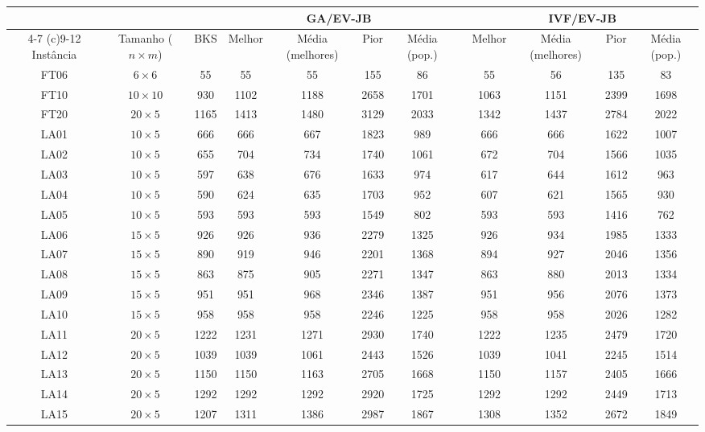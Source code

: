\begin{sidewaystable}
\caption{Resultados do caso de experimento 9}
\centering
\label{experimento9}
\begin{tabular}{cccccccccccc}
\toprule
& & & \multicolumn{4}{c}{GA/EV-JB} & & \multicolumn{4}{c}{IVF/EV-JB} \\
\cmidrule(c){4-7}
\cmidrule(c){9-12}
Inst\^{a}ncia & Tamanho ($n \times m$) & BKS & Melhor & M\'{e}dia (melhores) & Pior & M\'{e}dia (pop.) & & Melhor & M\'{e}dia (melhores) & Pior & M\'{e}dia (pop.) \\
\midrule
FT06 & $6 \times 6$ & 55 & 55 & 55 & 155 & 86 & & 55 & 56 & 135 & 83 \\
FT10 & $10 \times 10$ & 930 & 1102 & 1188 & 2658 & 1701 & & 1063 & 1151 & 2399 & 1698 \\
FT20 & $20 \times 5$ & 1165 & 1413 & 1480 & 3129 & 2033 & & 1342 & 1437 & 2784 & 2022 \\
LA01 & $10 \times 5$ & 666 & 666 & 667 & 1823 & 989 & & 666 & 666 & 1622 & 1007 \\
LA02 & $10 \times 5$ & 655 & 704 & 734 & 1740 & 1061 & & 672 & 704 & 1566 & 1035 \\
LA03 & $10 \times 5$ & 597 & 638 & 676 & 1633 & 974 & & 617 & 644 & 1612 & 963 \\
LA04 & $10 \times 5$ & 590 & 624 & 635 & 1703 & 952 & & 607 & 621 & 1565 & 930 \\
LA05 & $10 \times 5$ & 593 & 593 & 593 & 1549 & 802 & & 593 & 593 & 1416 & 762 \\
LA06 & $15 \times 5$ & 926 & 926 & 936 & 2279 & 1325 & & 926 & 934 & 1985 & 1333 \\
LA07 & $15 \times 5$ & 890 & 919 & 946 & 2201 & 1368 & & 894 & 927 & 2046 & 1356 \\
LA08 & $15 \times 5$ & 863 & 875 & 905 & 2271 & 1347 & & 863 & 880 & 2013 & 1334 \\
LA09 & $15 \times 5$ & 951 & 951 & 968 & 2346 & 1387 & & 951 & 956 & 2076 & 1373 \\
LA10 & $15 \times 5$ & 958 & 958 & 958 & 2246 & 1225 & & 958 & 958 & 2026 & 1282 \\
LA11 & $20 \times 5$ & 1222 & 1231 & 1271 & 2930 & 1740 & & 1222 & 1235 & 2479 & 1720 \\
LA12 & $20 \times 5$ & 1039 & 1039 & 1061 & 2443 & 1526 & & 1039 & 1041 & 2245 & 1514 \\
LA13 & $20 \times 5$ & 1150 & 1150 & 1163 & 2705 & 1668 & & 1150 & 1157 & 2405 & 1666 \\
LA14 & $20 \times 5$ & 1292 & 1292 & 1292 & 2920 & 1725 & & 1292 & 1292 & 2449 & 1713 \\
LA15 & $20 \times 5$ & 1207 & 1311 & 1386 & 2987 & 1867 & & 1308 & 1352 & 2672 & 1849 \\
\bottomrule
\end{tabular}
\end{sidewaystable}
